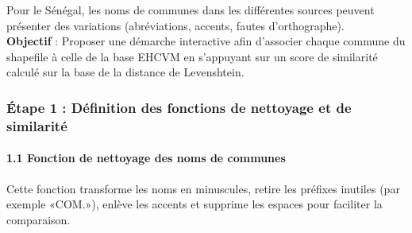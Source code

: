 \documentclass[
]{article}
\begin{document}
Pour le Sénégal, les noms de communes dans les différentes sources
peuvent présenter des variations (abréviations, accents, fautes
d'orthographe).\\
\textbf{Objectif} : Proposer une démarche interactive afin d'associer
chaque commune du shapefile à celle de la base EHCVM en s'appuyant sur
un score de similarité calculé sur la base de la distance de
Levenshtein.

\hypertarget{uxe9tape-1-duxe9finition-des-fonctions-de-nettoyage-et-de-similarituxe9}{%
\subsubsection{Étape 1 : Définition des fonctions de nettoyage et de
similarité}\label{uxe9tape-1-duxe9finition-des-fonctions-de-nettoyage-et-de-similarituxe9}}

\hypertarget{fonction-de-nettoyage-des-noms-de-communes}{%
\paragraph{1.1 Fonction de nettoyage des noms de
communes}\label{fonction-de-nettoyage-des-noms-de-communes}}

Cette fonction transforme les noms en minuscules, retire les préfixes
inutiles (par exemple «COM.»), enlève les accents et supprime les
espaces pour faciliter la comparaison.
\end{document}
